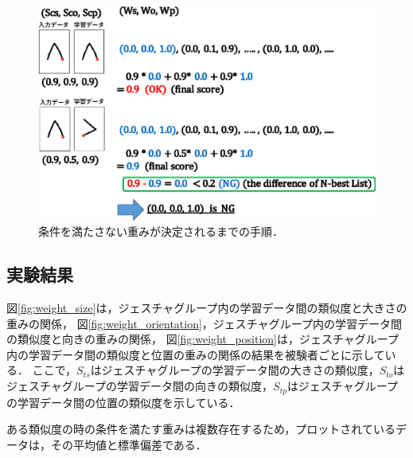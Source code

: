 \begin{figure} [h!]
	\begin{center}
		\includegraphics [width=0.8\hsize ]{img/weight_method1.eps}
	\end{center}
	\caption{条件を満たさない重みが決定されるまでの手順．}
	\label{fig:weight_method2}
\end{figure}

\clearpage
\subsection{実験結果}

図\ref{fig:weight_size}は，ジェスチャグループ内の学習データ間の類似度と大きさの重みの関係，
図\ref{fig:weight_orientation}，ジェスチャグループ内の学習データ間の類似度と向きの重みの関係，
図\ref{fig:weight_position}は，ジェスチャグループ内の学習データ間の類似度と位置の重みの関係の結果を被験者ごとに示している．
ここで，$S_\textit{ts}$はジェスチャグループの学習データ間の大きさの類似度，$S_\textit{to}$はジェスチャグループの学習データ間の向きの類似度，$S_\textit{tp}$はジェスチャグループの学習データ間の位置の類似度を示している．

ある類似度の時の条件を満たす重みは複数存在するため，プロットされているデータは，その平均値と標準偏差である．


